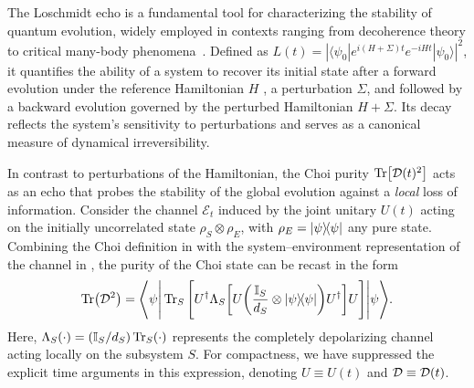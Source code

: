 \documentclass[pra,twocolumn,aps,showpacs,superscriptaddress,longbibliography]{revtex4-2}%
\providecommand{\DIFadd}[1]{{\protect\color{blue} \sf #1}} %
\providecommand{\DIFdel}[1]{{\protect\color{red} \scriptsize #1}} %
\providecommand{\DIFaddbegin}{} %
\providecommand{\DIFaddend}{} %
\providecommand{\DIFdelbegin}{} %
\providecommand{\DIFdelend}{} %
\begin{document}
The Loschmidt echo is a fundamental tool for characterizing the stability of quantum evolution, widely employed in contexts ranging from decoherence theory to critical many-body phenomena~\cite{peres_1984_stability,gorin_2006_dynamics}. 
Defined as $L(t) = |\langle \psi_0 | e^{i (H+\Sigma) t} e^{-i H t} | \psi_0 \rangle|^2$, it quantifies the ability of a system to recover its initial state after a forward evolution \DIFaddbegin \DIFadd{under the reference Hamiltonian }\DIFaddend $H$ \DIFdelbegin \DIFdel{, a perturbation $\Sigma$, and }\DIFdelend \DIFaddbegin \DIFadd{followed by }\DIFaddend a backward evolution \DIFaddbegin \DIFadd{governed by the perturbed Hamiltonian $H + \Sigma$}\DIFaddend .
Its decay reflects the system’s sensitivity to perturbations and serves as a canonical measure of dynamical irreversibility.

In contrast to perturbations of the Hamiltonian, the Choi purity  $\Tr[\mathcal{D}(t)^2]$ acts as an echo that probes the stability of the global evolution against a \textit{local} loss of information. Consider the channel $\mathcal{E}_t$ induced by the joint unitary $U(t)$ acting on the initially uncorrelated state $\rho_S\otimes\rho_E$, with $\rho_E=\dyad{\psi}$ any pure state. Combining the Choi definition in  with the system–environment representation of the channel in , the purity of the Choi state can be recast in the form
\begin{equation}\label{eq:choi_as_le}
\Tr(\mcD^2) = \Bigg\langle\psi\Bigg|
\Tr_S\Bigg[
U^\dagger \Lambda_S \bqty{
U \pqty{\frac{\mathbb{I}_S}{d_S} \otimes \dyad{\psi} } U^\dagger
} U
\Bigg]
\Bigg|\psi\Bigg\rangle.
\end{equation}
Here, $\Lambda_S(\cdot) = (\mathbb{I}_S/d_S)\Tr_S(\cdot)$ represents the completely depolarizing channel acting locally on the subsystem $S$. 
For compactness, we have suppressed the explicit time arguments in this expression, denoting $U \equiv U(t)$ and $\mathcal{D} \equiv \mathcal{D}(t)$.
\end{document}
